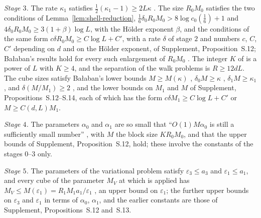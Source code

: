 \documentclass[11pt]{preprint}
\numberwithin{equation}{section}
\theoremstyle{definition}
\theoremstyle{remark}
\theoremstyle{plain}
\begin{document}
\emph{Stage $3$.} The rate $\kappa_1$ satisfies $\frac12(\kappa_1 - 1) \geq 2L\kappa$ \cite[p.~20]{BalabanRG2}. The size $R_0M_0$ satisfies the two conditions of Lemma~\ref{lem:shell-reduction}, $\frac16\delta_0R_0M_0 > 8\log c_0(\frac16) + 1$ and $4\delta_0R_0M_0 \geq 3(1 + \beta)\log L$, with the H\"older exponent $\beta$, and the conditions of the same form $c\delta R_0M_0 \geq C\log L + C'$, with a rate $\delta$ of stage $2$ and numbers $c$, $C$, $C'$ depending on $d$ and on the H\"older exponent, of Supplement, Proposition~S.12; Ba{\l}aban's results hold for every such enlargement of $R_0M_0$ \cite[p.~408]{BalabanPBG}. The integer $K$ of \cite[p.~408]{BalabanPBG} is a power of $L$ with $K \geq 4$, and the separation of the walk problems is $R \geq 12dL$. The cube sizes satisfy Ba{\l}aban's lower bounds $M \geq M(\kappa)$ \cite[Theorem~3, p.~264]{BalabanRG1}, $\delta_0M \geq \kappa$ \cite[p.~21]{BalabanRG2}, $\delta_1M \geq \kappa_1$ \cite[p.~5]{BalabanRG2}, and $\delta(M/M_1) \geq 2$ \cite[p.~186]{BalabanLFR1}, and the lower bounds on $M_1$ and $M$ of Supplement, Propositions~S.12--S.14, each of which has the form $c\delta M_1 \geq C\log L + C'$ or $M \geq C(d, L)M_1$.

\emph{Stage $4$.} The parameters $\alpha_0$ and $\alpha_1$ are so small that ``$O(1)M\alpha_0$ is still a sufficiently small number'' \cite[p.~396]{BalabanPBG}, with $M$ the block size $KR_0M_0$, and that the upper bounds of Supplement, Proposition~S.12, hold; these involve the constants of the stages $0$--$3$ only.

\emph{Stage $5$.} The parameters of the variational problem satisfy $\varepsilon_3 \leq a_3$ \cite[Proposition~4, p.~292]{BalabanVAR} and $\varepsilon_1 \leq a_1$, and every cube of the parameter $M_V$ at which \cite[Theorem~1]{BalabanVAR} is applied has $M_V \leq M(\varepsilon_1) = R_1M_1a_1/\varepsilon_1$ \cite[p.~279]{BalabanVAR}, an upper bound on $\varepsilon_1$; the further upper bounds on $\varepsilon_3$ and $\varepsilon_1$ in terms of $\alpha_0$, $\alpha_1$, and the earlier constants are those of Supplement, Propositions~S.12 and~S.13.
\end{document}
